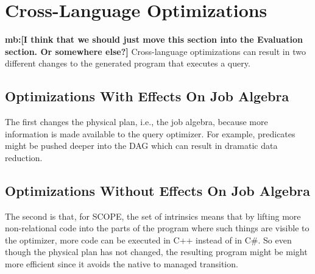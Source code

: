 \section{Cross-Language Optimizations}
{\bf mb:[I think that we should just move this section into the Evaluation section. Or somewhere else?]}
Cross-language optimizations can result in two different changes to the generated program that executes a query.

\subsection{Optimizations With Effects On Job Algebra}
The first changes the physical plan, i.e., the job algebra, because more information is
made available to the query optimizer.
For example, predicates might be pushed deeper into the DAG which can result in dramatic data reduction.


\subsection{Optimizations Without Effects On Job Algebra}
The second is that, for SCOPE, the set of intrinsics means that by lifting more non-relational code into the parts of the program where such things are visible to the optimizer, more code can be executed in C++ instead of in C\#.
So even though the physical plan has not changed, the resulting program might be might more efficient since it avoids the native to managed transition.

